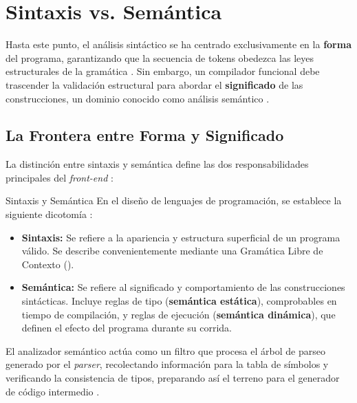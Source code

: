\section{Sintaxis vs. Semántica}
\label{sec:3_7_sintaxis_semantica}

Hasta este punto, el análisis sintáctico se ha centrado exclusivamente en la \textbf{forma} del programa, garantizando que la secuencia de tokens obedezca las leyes estructurales de la gramática \cite{aho2006compilers}. Sin embargo, un compilador funcional debe trascender la validación estructural para abordar el \textbf{significado} de las construcciones, un dominio conocido como análisis semántico \cite{aho2006compilers}.

\subsection{La Frontera entre Forma y Significado}
\label{subsec:3_7_1_frontera}

La distinción entre sintaxis y semántica define las dos responsabilidades principales del \textit{front-end} \cite{aho2006compilers}:

\begin{definicion}{Sintaxis y Semántica}
En el diseño de lenguajes de programación, se establece la siguiente dicotomía \cite{aho2006compilers,sipser2012introduction}:
\begin{itemize}
    \item \textbf{Sintaxis:} Se refiere a la apariencia y estructura superficial de un programa válido. Se describe convenientemente mediante una Gramática Libre de Contexto ().
    \item \textbf{Semántica:} Se refiere al significado y comportamiento de las construcciones sintácticas. Incluye reglas de tipo (\textbf{semántica estática}), comprobables en tiempo de compilación, y reglas de ejecución (\textbf{semántica dinámica}), que definen el efecto del programa durante su corrida.
\end{itemize}
\end{definicion}

El analizador semántico actúa como un filtro que procesa el árbol de parseo generado por el \textit{parser}, recolectando información para la tabla de símbolos y verificando la consistencia de tipos, preparando así el terreno para el generador de código intermedio \cite{aho2006compilers}.

